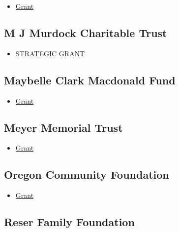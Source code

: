 \documentclass[
  letterpaper,
  DIV=11,
  numbers=noendperiod]{scrreprt}
\providecommand{\tightlist}{%
  \setlength{\itemsep}{0pt}\setlength{\parskip}{0pt}}\usepackage{longtable,booktabs,array}
\begin{document}
\begin{itemize}
\tightlist
\item
  \href{https://www.gordonelwoodfoundation.org/index}{Grant}
\end{itemize}

\subsection{M J Murdock Charitable
Trust}\label{m-j-murdock-charitable-trust}

\begin{itemize}
\tightlist
\item
  \href{https://murdocktrust.org/grant-application-process/}{STRATEGIC
  GRANT}
\end{itemize}

\subsection{Maybelle Clark Macdonald
Fund}\label{maybelle-clark-macdonald-fund}

\begin{itemize}
\tightlist
\item
  \href{https://mcmfundgiving.org/grants/}{Grant}
\end{itemize}

\subsection{Meyer Memorial Trust}\label{meyer-memorial-trust}

\begin{itemize}
\tightlist
\item
  \href{https://mmt.org/}{Grant}
\end{itemize}

\subsection{Oregon Community
Foundation}\label{oregon-community-foundation}

\begin{itemize}
\tightlist
\item
  \href{https://oregoncf.org/grants-and-scholarships/grants/}{Grant}
\end{itemize}

\subsection{Reser Family Foundation}\label{reser-family-foundation}
\end{document}
